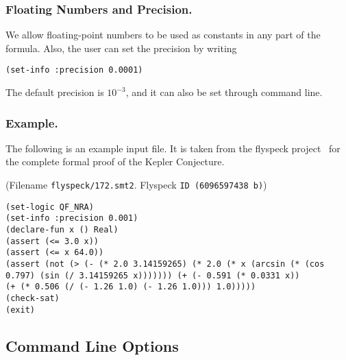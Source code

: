 \documentclass[envcountsect]{llncs}
\begin{document}
\subsubsection{Floating Numbers and Precision.} We allow floating-point numbers
to be used as constants in any part of the formula. Also, the user can set the
precision by writing
\begin{verbatim}
(set-info :precision 0.0001)
\end{verbatim}
The default precision is $10^{-3}$, and it can also be set through command
line.

\subsubsection{Example.}\label{example} The following is an example input file.
It is taken from the flyspeck project~\cite{DBLP:conf/dagstuhl/Hales05} for the complete formal proof of
the Kepler Conjecture.
 \begin{example} (Filename {\tt flyspeck/172.smt2}. Flyspeck {\tt ID (6096597438
b)})
 \begin{verbatim}
(set-logic QF_NRA)
(set-info :precision 0.001)
(declare-fun x () Real)
(assert (<= 3.0 x))
(assert (<= x 64.0))
(assert (not (> (- (* 2.0 3.14159265) (* 2.0 (* x (arcsin (* (cos
0.797) (sin (/ 3.14159265 x))))))) (+ (- 0.591 (* 0.0331 x))
(+ (* 0.506 (/ (- 1.26 1.0) (- 1.26 1.0))) 1.0)))))
(check-sat)
(exit)
\end{verbatim}
\end{example}

\subsection{Command Line Options}
\end{document}
